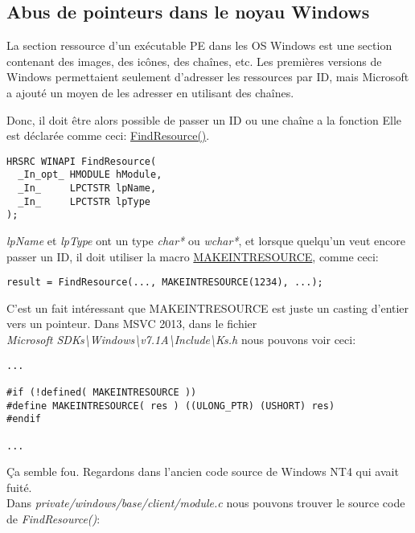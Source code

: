 \subsection{Abus de pointeurs dans le noyau Windows}

La section ressource d'un exécutable PE dans les OS Windows est une section contenant
des images, des icônes, des chaînes, etc.
Les premières versions de Windows permettaient seulement d'adresser les ressources
par ID, mais Microsoft a ajouté un moyen de les adresser en utilisant des chaînes.

Donc, il doit être alors possible de passer un ID ou une chaîne a la fonction
Elle est déclarée comme ceci:
\href{https://msdn.microsoft.com/en-us/library/windows/desktop/ms648042i\%28v=vs.85\%29.aspx}{FindResource()}.


\begin{lstlisting}[style=customc]
HRSRC WINAPI FindResource(
  _In_opt_ HMODULE hModule,
  _In_     LPCTSTR lpName,
  _In_     LPCTSTR lpType
);
\end{lstlisting}

\emph{lpName} et \emph{lpType} ont un type \emph{char*} ou \emph{wchar*}, et lorsque quelqu'un 
veut encore passer un ID, il doit utiliser la macro
\href{https://msdn.microsoft.com/en-us/library/windows/desktop/ms648029\%28v=vs.85\%29.aspx}{MAKEINTRESOURCE},
comme ceci:


\begin{lstlisting}[style=customc]
result = FindResource(..., MAKEINTRESOURCE(1234), ...);
\end{lstlisting}

C'est un fait intéressant que MAKEINTRESOURCE est juste un casting d'entier vers un pointeur.
Dans MSVC 2013, dans le fichier\\\emph{Microsoft SDKs\textbackslash{}Windows\textbackslash{}v7.1A\textbackslash{}Include\textbackslash{}Ks.h}
nous pouvons voir ceci:

\begin{lstlisting}[style=customc]
...

#if (!defined( MAKEINTRESOURCE )) 
#define MAKEINTRESOURCE( res ) ((ULONG_PTR) (USHORT) res)
#endif

...
\end{lstlisting}

Ça semble fou. Regardons dans l'ancien code source de Windows NT4 qui avait fuité.\\
Dans \emph{private/windows/base/client/module.c} nous pouvons trouver le source code
de \emph{FindResource()}:

